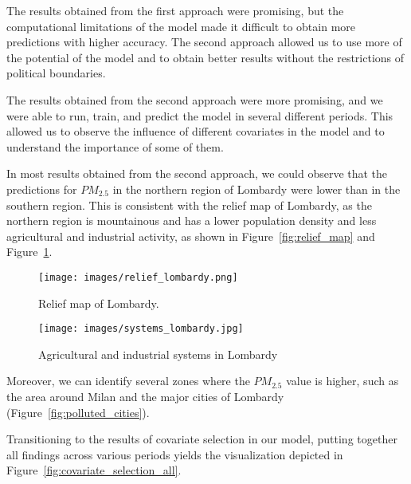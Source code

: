 \documentclass[11pt,a4paper]{article}
\begin{document}
The results obtained from the first approach were promising, but the computational limitations of the model made it difficult to obtain more predictions with higher accuracy. The second approach allowed us to use more of the potential of the model and to obtain better results without the restrictions of political boundaries.

The results obtained from the second approach were more promising, and we were able to run, train, and predict the model in several different periods. This allowed us to observe the influence of different covariates in the model and to understand the importance of some of them.

In most results obtained from the second approach, we could observe that the predictions for $PM_{2.5}$ in the northern region of Lombardy were lower than in the southern region. This is consistent with the relief map of Lombardy, as the northern region is mountainous and has a lower population density and less agricultural and industrial activity, as shown in Figure~\ref{fig:relief_map} and Figure~\ref{fig:systems_lombardy}.

\begin{figure}[H]
    \begin{minipage}{0.48\textwidth}
        \centering
        \texttt{[image: images/relief\_lombardy.png]}
        \captionsetup{format=hang}
        \caption{Relief map of Lombardy.}
        \label{fig:relief_map}
    \end{minipage}
    \hfill
    \begin{minipage}{0.48\textwidth}
        \centering
        \texttt{[image: images/systems\_lombardy.jpg]}
        \captionsetup{format=hang}
        \caption{Agricultural and industrial systems in Lombardy \cite{inproceedings}}
        \label{fig:systems_lombardy}
    \end{minipage}
\end{figure}

Moreover, we can identify several zones where the $PM_{2.5}$ value is higher, such as the area around Milan and the major cities of Lombardy (Figure~\ref{fig:polluted_cities}).


Transitioning to the results of covariate selection in our model, putting together all findings across various periods yields the visualization depicted in Figure~\ref{fig:covariate_selection_all}.
\end{document}
